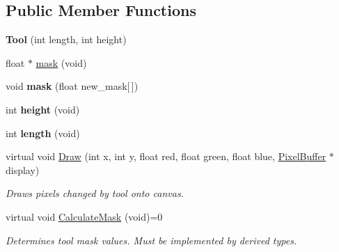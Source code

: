 \subsection*{Public Member Functions}
\begin{DoxyCompactItemize}
\item 
{\bfseries Tool} (int length, int height)\hypertarget{classimage__tools_1_1Tool_a2ac06b88e10fc31ad4c6789c626f4a4d}{}\label{classimage__tools_1_1Tool_a2ac06b88e10fc31ad4c6789c626f4a4d}

\item 
float $\ast$ \hyperlink{classimage__tools_1_1Tool_afe9df5a299fe9295e9dd2d0c2d049bff}{mask} (void)
\item 
void {\bfseries mask} (float new\+\_\+mask\mbox{[}$\,$\mbox{]})\hypertarget{classimage__tools_1_1Tool_a086b6e950505b2a5465b2146c4b2d468}{}\label{classimage__tools_1_1Tool_a086b6e950505b2a5465b2146c4b2d468}

\item 
int {\bfseries height} (void)\hypertarget{classimage__tools_1_1Tool_a2102161c79dd24c07a4db2f1d08f8f3c}{}\label{classimage__tools_1_1Tool_a2102161c79dd24c07a4db2f1d08f8f3c}

\item 
int {\bfseries length} (void)\hypertarget{classimage__tools_1_1Tool_ac33adcaf196d5f332d371c8cbcc1a91b}{}\label{classimage__tools_1_1Tool_ac33adcaf196d5f332d371c8cbcc1a91b}

\item 
virtual void \hyperlink{classimage__tools_1_1Tool_aa5a313769f2a2c5c83b816da81e82bd2}{Draw} (int x, int y, float red, float green, float blue, \hyperlink{classimage__tools_1_1PixelBuffer}{Pixel\+Buffer} $\ast$display)\hypertarget{classimage__tools_1_1Tool_aa5a313769f2a2c5c83b816da81e82bd2}{}\label{classimage__tools_1_1Tool_aa5a313769f2a2c5c83b816da81e82bd2}

\begin{DoxyCompactList}\small\item\em Draws pixels changed by tool onto canvas. \end{DoxyCompactList}\item 
virtual void \hyperlink{classimage__tools_1_1Tool_a9a3b2b9aaaa66f007022ec221d89f8fd}{Calculate\+Mask} (void)=0\hypertarget{classimage__tools_1_1Tool_a9a3b2b9aaaa66f007022ec221d89f8fd}{}\label{classimage__tools_1_1Tool_a9a3b2b9aaaa66f007022ec221d89f8fd}

\begin{DoxyCompactList}\small\item\em Determines tool mask values. Must be implemented by derived types. \end{DoxyCompactList}\end{DoxyCompactItemize}
